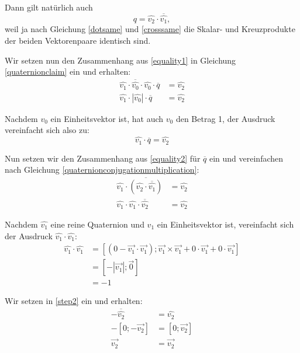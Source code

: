 Dann gilt natürlich auch
\begin{equation}
 \label{equality2}
 q = \hat{v_2} \cdot \overline{\hat{v_1}},
\end{equation} 
weil ja nach Gleichung \ref{dotsame} und \ref{crosssame} die Skalar- und Kreuzprodukte der beiden Vektorenpaare identisch sind.

Wir setzen nun den Zusammenhang aus \ref{equality1} in Gleichung \ref{quaternionclaim} ein und erhalten:
\begin{equation}
\begin{split}
 \label{step1}
 \hat{v_1} \cdot \overline{\hat{v_0}} \cdot \hat{v_0} \cdot \overline{q} &= \hat{v_2} \\
 \hat{v_1} \cdot \left| \hat{v_0} \right| \cdot \overline{q} &= \hat{v_2}
\end{split}
\end{equation}

Nachdem $v_0$ ein Einheitsvektor ist, hat auch $\hat{v_0}$ den Betrag 1, der Ausdruck vereinfacht sich also zu:
\begin{equation}
 \hat{v_1} \cdot \overline{q} = \hat{v_2}
\end{equation}

Nun setzen wir den Zusammenhang aus \ref{equality2} für $\overline{q}$ ein und vereinfachen nach Gleichung \ref{quaternionconjugationmultiplication}:
\begin{equation}
\begin{split}
 \label{step2}
 \hat{v_1} \cdot \overline{\left( \hat{v_2} \cdot \overline{\hat{v_1}} \right)} &= \hat{v_2} \\
 \hat{v_1} \cdot \hat{v_1} \cdot \overline{\hat{v_2}} &= \hat{v_2}
\end{split}
\end{equation}

Nachdem $\hat{v_1}$ eine reine Quaternion und $v_1$ ein Einheitsvektor ist, vereinfacht sich der Ausdruck $\hat{v_1} \cdot \hat{v_1}$:
\begin{equation}
\begin{split}
 \hat{v_1} \cdot \hat{v_1} &= \left[ \left( 0 - \vec{v_1} \cdot \vec{v_1} \right); \vec{v_1} \times \vec{v_1} + 0 \cdot \vec{v_1} + 0 \cdot \vec{v_1} \right] \\
 &= \left[ -\left| \vec{v_1} \right|; \vec 0 \right] \\
 &= -1
\end{split}
\end{equation}

Wir setzen in \ref{step2} ein und erhalten:
\begin{equation}
\begin{split}
 -\overline{\hat{v_2}} &= \hat{v_2} \\
 -\left[ 0; -\vec{v_2} \right] &= \left[ 0; \vec{v_2} \right] \\
 \vec{v_2} &= \vec{v_2}
\end{split}
\end{equation}

